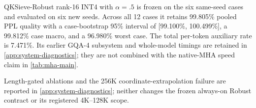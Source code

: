 QKSieve-Robust rank-16 INT4 with $\alpha=.5$ is frozen on the six same-seed
cases and evaluated on six new seeds.  Across all 12 cases it retains
99.805\% pooled PPL quality with a case-bootstrap 95\% interval of
[99.100\%, 100.499\%], a 99.812\% case macro, and a 96.980\% worst case.
The total per-token auxiliary rate is 7.471\%.  Its earlier GQA-4 subsystem
and whole-model timings are retained in \cref{app:system-diagnostics}; they
are not combined with the native-MHA speed claim in \cref{tab:mha-main}.

Length-gated ablations and the 256K coordinate-extrapolation failure are
reported in \cref{app:system-diagnostics}; neither changes the frozen
always-on Robust contract or its registered 4K--128K scope.
